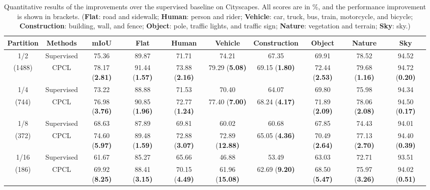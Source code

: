 \documentclass[journal]{IEEEtran}
\begin{document}
\begin{table*}
  \footnotesize
  \caption{Quantitative results of the improvements over the supervised baseline on Cityscapes. All scores are in \%, and the performance improvement is shown 
  in brackets. (\textbf{Flat}: road and sidewalk; \textbf{Human}: person and rider; \textbf{Vehicle}: car, truck, bus, train, motorcycle, and bicycle; \textbf{Construction}: 
  building, wall, and fence; \textbf{Object}: pole, traffic lights, and traffic sign; \textbf{Nature}: vegetation and terrain; \textbf{Sky}: sky.)}
  \begin{center}
  \renewcommand{\arraystretch}{1.4}
  \begin{tabular}{cc|c|ccccccc} 
  \hline
    Partition   & Methods      & mIoU              & Flat              & Human              & Vehicle             & Construction             & Object             & Nature             & Sky      \\ \hline
    1/2         & Supervised   & 75.36             & 89.87             & 71.71              & 74.21               & 67.35                    & 69.91              & 78.52              & 94.52    \\
    (1488)      & CPCL         & 78.17 (\bf 2.81)  & 91.44 (\bf 1.57)  & 73.88 (\bf 2.16)   & 79.29 (\bf 5.08)    & 69.15 (\bf 1.80)         & 72.44 (\bf 2.53)   & 79.68 (\bf 1.16)   & 94.72 (\bf 0.20)   \\ \hline
    1/4         & Supervised   & 73.22             & 88.88             & 71.53              & 70.40               & 64.07                    & 69.80              & 75.98              & 94.34    \\
    (744)       & CPCL         & 76.98 (\bf 3.76)  & 90.85 (\bf 1.96)  & 72.77 (\bf 1.24)   & 77.40 (\bf 7.00)    & 68.24 (\bf 4.17)         & 71.89 (\bf 2.09)   & 78.06 (\bf 2.08)   & 94.50 (\bf 0.17)   \\ \hline
    1/8         & Supervised   & 68.63             & 87.89             & 69.81              & 60.02               & 60.68                    & 67.85              & 74.43              & 94.01    \\
    (372)       & CPCL         & 74.60 (\bf 5.97)  & 89.48 (\bf 1.59)  & 72.88 (\bf 3.07)   & 72.89 (\bf 12.88)   & 65.05 (\bf 4.36)         & 70.49 (\bf 2.64)   & 77.13 (\bf 2.70)   & 94.40 (\bf 0.39)   \\ \hline
    1/16        & Supervised   & 61.67             & 85.27             & 65.66              & 46.88               & 53.49                    & 63.03              & 72.71              & 93.51    \\
    (186)       & CPCL         & 69.92 (\bf 8.25)  & 88.41 (\bf 3.15)  & 70.15 (\bf 4.49)   & 61.96 (\bf 15.08)   & 62.69 (\bf 9.20)         & 68.50 (\bf 5.47)   & 75.97 (\bf 3.26)   & 94.02 (\bf 0.51)   \\ \hline

  \end{tabular}
  \end{center}
  \label{tab:cs_sup_unsup}
\end{table*}
\end{document}
